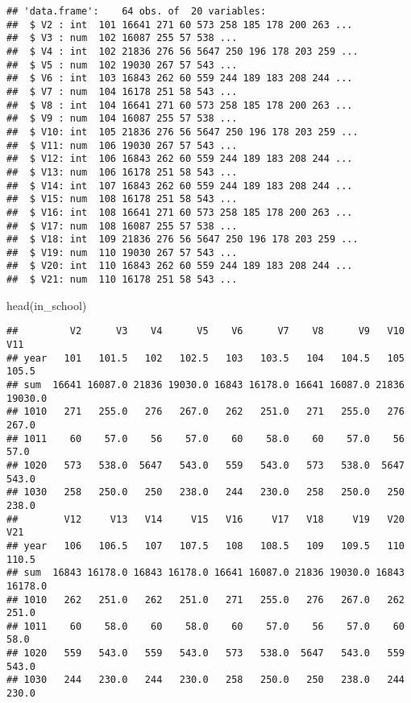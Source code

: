 \documentclass[
]{article}
\newenvironment{Shaded}{\begin{snugshade}}{\end{snugshade}}
\newcommand{\FunctionTok}[1]{\textcolor[rgb]{0.00,0.00,0.00}{#1}}
\newcommand{\NormalTok}[1]{#1}
\begin{document}
\begin{verbatim}
## 'data.frame':    64 obs. of  20 variables:
##  $ V2 : int  101 16641 271 60 573 258 185 178 200 263 ...
##  $ V3 : num  102 16087 255 57 538 ...
##  $ V4 : int  102 21836 276 56 5647 250 196 178 203 259 ...
##  $ V5 : num  102 19030 267 57 543 ...
##  $ V6 : int  103 16843 262 60 559 244 189 183 208 244 ...
##  $ V7 : num  104 16178 251 58 543 ...
##  $ V8 : int  104 16641 271 60 573 258 185 178 200 263 ...
##  $ V9 : num  104 16087 255 57 538 ...
##  $ V10: int  105 21836 276 56 5647 250 196 178 203 259 ...
##  $ V11: num  106 19030 267 57 543 ...
##  $ V12: int  106 16843 262 60 559 244 189 183 208 244 ...
##  $ V13: num  106 16178 251 58 543 ...
##  $ V14: int  107 16843 262 60 559 244 189 183 208 244 ...
##  $ V15: num  108 16178 251 58 543 ...
##  $ V16: int  108 16641 271 60 573 258 185 178 200 263 ...
##  $ V17: num  108 16087 255 57 538 ...
##  $ V18: int  109 21836 276 56 5647 250 196 178 203 259 ...
##  $ V19: num  110 19030 267 57 543 ...
##  $ V20: int  110 16843 262 60 559 244 189 183 208 244 ...
##  $ V21: num  110 16178 251 58 543 ...
\end{verbatim}

\begin{Shaded}
\begin{Highlighting}[]
\FunctionTok{head}\NormalTok{(in\_school)}
\end{Highlighting}
\end{Shaded}

\begin{verbatim}
##         V2      V3    V4      V5    V6      V7    V8      V9   V10     V11
## year   101   101.5   102   102.5   103   103.5   104   104.5   105   105.5
## sum  16641 16087.0 21836 19030.0 16843 16178.0 16641 16087.0 21836 19030.0
## 1010   271   255.0   276   267.0   262   251.0   271   255.0   276   267.0
## 1011    60    57.0    56    57.0    60    58.0    60    57.0    56    57.0
## 1020   573   538.0  5647   543.0   559   543.0   573   538.0  5647   543.0
## 1030   258   250.0   250   238.0   244   230.0   258   250.0   250   238.0
##        V12     V13   V14     V15   V16     V17   V18     V19   V20     V21
## year   106   106.5   107   107.5   108   108.5   109   109.5   110   110.5
## sum  16843 16178.0 16843 16178.0 16641 16087.0 21836 19030.0 16843 16178.0
## 1010   262   251.0   262   251.0   271   255.0   276   267.0   262   251.0
## 1011    60    58.0    60    58.0    60    57.0    56    57.0    60    58.0
## 1020   559   543.0   559   543.0   573   538.0  5647   543.0   559   543.0
## 1030   244   230.0   244   230.0   258   250.0   250   238.0   244   230.0
\end{verbatim}
\end{document}
